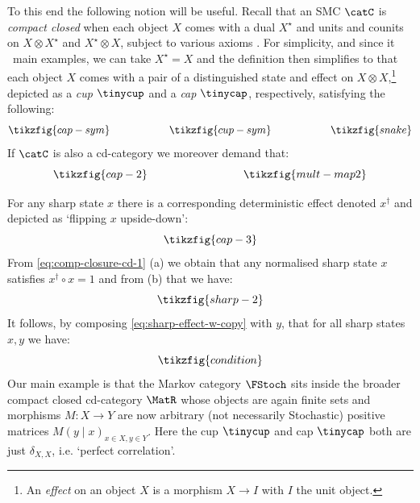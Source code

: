 \documentclass{article}
\begin{document}
{To this end the following notion will be useful. 
Recall that an SMC $\catC$ is \emph{compact closed} when each object $X$ comes with a dual $X^{\star}$ and units and counits on $X \otimes X^{\star}$ and $X^{\star} \otimes X$, subject to various axioms \cite{selinger2010survey}. For simplicity, and since it \ main examples, we can take $X^{\star} = X$ and the definition then simplifies to that each object $X$ comes with a pair of a distinguished state and effect on $X \otimes X$,\footnote{An \emph{effect} on an object $X$ is a morphism $X \rightarrow I$ with $I$ the unit object.} depicted as a \emph{cup} $\tinycup$ and a \emph{cap} $\tinycap$, respectively, satisfying the following: 
\begin{equation} \label{eq:compact-closure}
	\tikzfig{cap-sym} \hspace*{2cm}
	\tikzfig{cup-sym} \hspace*{2cm}
	\tikzfig{snake}
\end{equation}
If $\catC$ is also a cd-category we moreover demand that: 
\begin{equation} \label{eq:comp-closure-cd-1}
	\tikzfig{cap-2} \hspace*{3.0cm}
	\tikzfig{mult-map2}
\end{equation}

For any sharp state $x$ there is a corresponding deterministic effect denoted $x^\dagger$ and depicted as `flipping $x$ upside-down': 
\begin{equation} \label{eq:xupsidedown}
	\tikzfig{cap-3}
\end{equation}
From \eqref{eq:comp-closure-cd-1} (a) we obtain that any normalised sharp state $x$ satisfies $x^\dagger \circ x = 1$ and from (b) that we have: 
\begin{equation} \label{eq:sharp-effect-w-copy}
	\tikzfig{sharp-2}
\end{equation}
It follows, by composing \eqref{eq:sharp-effect-w-copy} with $y$, that for all sharp states $x, y$ we have: 
\begin{equation} \label{eq:comp-closure-2}
\tikzfig{condition}
\end{equation}
Our main example is that the Markov category $\FStoch$ sits inside the broader compact closed cd-category $\MatR$ whose objects are again finite sets and morphisms $M \colon X \to Y$ are now arbitrary (not necessarily Stochastic) positive matrices $M(y \mid x)_{x \in X, y \in Y}$. Here the cup $\tinycup$ and cap $\tinycap$ both are just $\delta_{X,X}$, i.e. `perfect correlation'.

}
\end{document}
